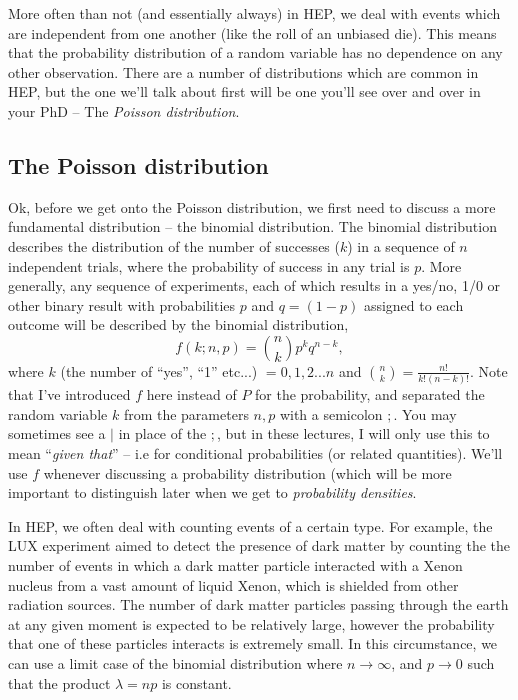 More often than not (and essentially always) in HEP, we deal with events which are independent from one another (like the roll of an unbiased die). This means that the probability distribution of a random variable has no dependence on any other observation. 
There are a number of distributions which are common in HEP, but the one we'll talk about first will be  one you'll see over and over in your PhD -- The \emph{Poisson distribution}. 

\subsection{The Poisson distribution }

Ok, before we get onto the Poisson distribution, we first need to discuss a more fundamental distribution -- the binomial distribution. The binomial distribution describes the distribution of the number of successes ($k$) in a sequence of $n$ independent trials, where the probability of success in any trial is $p$. More generally, any sequence of experiments, each of which results in a yes/no, 1/0 or other binary result with probabilities $p$ and $q=(1-p)$ assigned to each outcome will be described by the binomial distribution, 
\begin{equation}\label{eqn:binomial}
    f(k;n,p) = \binom{n}{k} p^{k}q^{n-k},
\end{equation}
where $k$ (the number of ``yes'', ``1'' etc...) $=0,1,2...n$ and  $\binom{n}{k}=\frac{n!}{k!(n-k)!}$.
Note that I've introduced $f$ here instead of $P$ for the probability, and separated the random variable $k$ from the parameters $n,p$ with a semicolon $;$.  You may sometimes see a $|$ in place of the $;$, but in these lectures, I will only use this to mean ``\emph{given that}'' -- i.e for conditional probabilities (or related quantities). We'll use $f$ whenever discussing a probability distribution (which will be more important to distinguish later when we get to \emph{probability densities}. 

In HEP, we often deal with counting events of a certain type. For example, the LUX experiment aimed to detect the presence of dark matter by counting the the number of events in which a dark matter particle interacted with a Xenon nucleus from a vast amount of liquid Xenon, which is shielded from other radiation sources. The number of dark matter particles passing through the earth at any given moment is expected to be relatively large, however the probability that one of these particles interacts is extremely small. In this circumstance, we can use a limit case of the binomial distribution where $n\rightarrow \infty$, and $p\rightarrow 0$ such that the product $\lambda = np$ is constant. 

